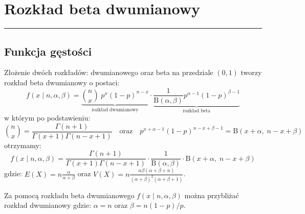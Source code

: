 \documentclass[polish,]{book}
\begin{document}
\hypertarget{R5}{%
\chapter{Rozkład beta dwumianowy}\label{R5}}

\begin{center}\rule{0.5\linewidth}{\linethickness}\end{center}

\hypertarget{R51}{%
\section{Funkcja gęstości}\label{R51}}

Złożenie dwóch rozkładów: dwumianowego oraz beta na przedziale \((0,1)\) tworzy rozkład beta dwumianowy o postaci:
\begin{equation}
f(x\;|\;n,\alpha,\beta)=\displaystyle\underbrace{{n\choose x}\;p^x (1-p)^{n-x}}_{\mbox{rozkład dwumianowy}} \cdot \displaystyle\underbrace{\frac{1}{\mathrm{B}(\alpha,\beta)}p^{\alpha-1}(1-p)^{\beta-1}}_{\mbox{rozkład beta}}
\label{eq:bb01}
\end{equation}
w którym po podstawieniu:
\[{n \choose x}=\frac{\Gamma(n+1)}{\Gamma(x+1)\Gamma(n-x+1)}\quad \mbox{oraz}\quad p^{x+\alpha-1}(1-p)^{n-x+\beta-1}=\mathrm{B}(x+\alpha,\;n-x+\beta)\]
otrzymamy:
\begin{equation}
f(x\;|\;n,\alpha,\beta)=\frac{\Gamma(n+1)}{\Gamma(x+1)\Gamma(n-x+1)}\cdot\frac{1}{\mathrm{B}(\alpha,\beta)}\cdot \mathrm{B}(x+\alpha, \;n-x+\beta)
\label{eq:bb02}
\end{equation}
gdzie:
\(E(X)=n\frac{\alpha}{\alpha+\beta}\) oraz \(V(X)=n\frac{\alpha\beta(\alpha+\beta+n)}{(\alpha+\beta)^2(\alpha+\beta+1)}\).

Za pomocą rozkładu beta dwumianowego \(f(x\;|\;n,\alpha,\beta)\) można przybliżać rozkład dwumianowy
gdzie: \(\alpha=n\) oraz \(\beta=n(1-p)/p\).
\end{document}

